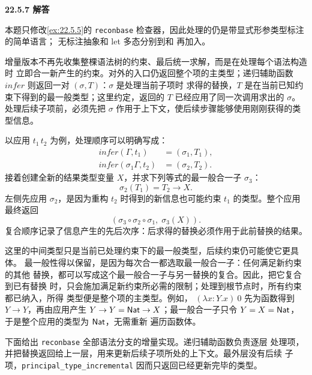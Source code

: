 \begin{taplsolutionentrybox}
\label{sol:translator:22.5.7}
\textbf{22.5.7 解答}

本题只修改\cref{ex:22.5.5}的
\texttt{reconbase} 检查器，因此处理的仍是带显式形参类型标注的简单语言；
无标注抽象和 let 多态分别到和
再加入。

增量版本不再先收集整棵语法树的约束、最后统一求解，而是在处理每个语法构造时
立即合一新产生的约束。对外的入口仍返回整个项的主类型；递归辅助函数
\(\mathit{infer}\) 则返回一对 \((\sigma,T)\)：\(\sigma\) 是处理当前子项时
求得的替换，\(T\) 是在当前已知约束下得到的最一般类型；这里约定，返回的
\(T\) 已经应用了同一次调用求出的 \(\sigma\)。处理后续子项前，必须先把
\(\sigma\) 作用于上下文，使后续步骤能够使用刚刚获得的类型信息。

以应用 \(t_1\,t_2\) 为例，处理顺序可以明确写成：
\[
\begin{aligned}
  \mathit{infer}(\Gamma,t_1)&=(\sigma_1,T_1),\\
  \mathit{infer}(\sigma_1\Gamma,t_2)&=(\sigma_2,T_2).
\end{aligned}
\]
接着创建全新的结果类型变量 \(X\)，并求下列等式的最一般合一子 \(\sigma_3\)：
\[
  \sigma_2(T_1)=T_2\to X.
\]
左侧先应用 \(\sigma_2\)，是因为重构 \(t_2\) 时得到的新信息也可能约束
\(t_1\) 的类型。整个应用最终返回
\[
  (\sigma_3\circ\sigma_2\circ\sigma_1,\;\sigma_3(X)).
\]
复合顺序记录了信息产生的先后次序：后求得的替换必须作用于此前替换的结果。

这里的中间类型只是当前已处理约束下的最一般类型，后续约束仍可能使它更具体。
最一般性得以保留，是因为每次合一都选取最一般合一子：任何满足新约束的其他
替换，都可以写成这个最一般合一子与另一替换的复合。因此，把它复合到已有替换
时，只会施加满足新约束所必需的限制；处理到根节点时，所有约束都已纳入，所得
类型便是整个项的主类型。例如，
\((\lambda x:Y.x)\ 0\) 先为函数得到 \(Y\to Y\)，再由应用产生
\(Y\to Y=\mathsf{Nat}\to X\)；最一般合一子只令
\(Y=X=\mathsf{Nat}\)，于是整个应用的类型为 \(\mathsf{Nat}\)，无需重新
遍历函数体。

下面给出 \texttt{reconbase} 全部语法分支的增量实现。递归辅助函数负责逐层
处理项，并把替换返回给上一层，用来更新后续子项所处的上下文。最外层没有后续
子项，\texttt{principal\_type\_incremental} 因而只返回已经更新完毕的类型。

\end{taplsolutionentrybox}

